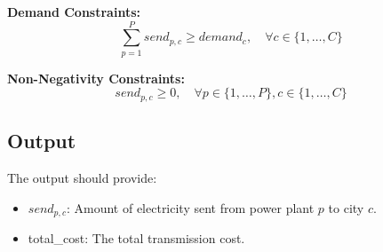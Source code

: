 \documentclass{article}
\begin{document}
\textbf{Demand Constraints:}
\[
\sum_{p=1}^{P} send_{p,c} \geq demand_{c}, \quad \forall c \in \{1, \ldots, C\}
\]

\textbf{Non-Negativity Constraints:}
\[
send_{p,c} \geq 0, \quad \forall p \in \{1, \ldots, P\}, c \in \{1, \ldots, C\}
\]

\subsection*{Output}
The output should provide:
\begin{itemize}
    \item $send_{p,c}$: Amount of electricity sent from power plant $p$ to city $c$.
    \item total\_cost: The total transmission cost.
\end{itemize}
\end{document}
